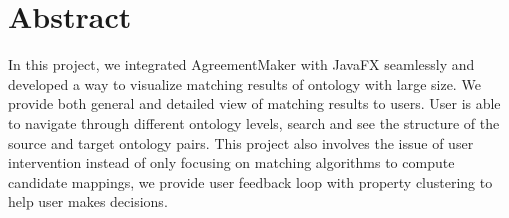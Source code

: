 \section*{Abstract}
In this project, we integrated AgreementMaker \cite{AgreementMaker} with JavaFX seamlessly and developed a way to visualize matching results of ontology with large size. We provide both general and detailed view of matching results to users. User is able to navigate through different ontology levels, search and see the structure of the source and target ontology pairs. This project also involves the issue of user intervention instead of only focusing on matching algorithms to compute candidate mappings, we provide user feedback loop with property clustering to help user makes decisions.\\[2cm]

